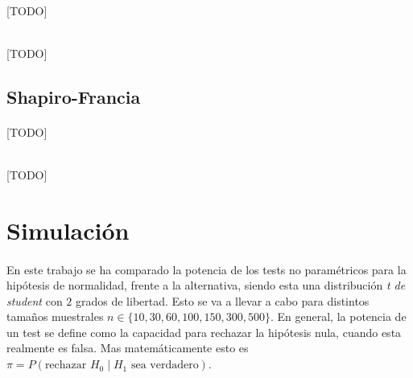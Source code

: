 \documentclass[a4paper, spanish]{article}
\begin{document}
      \paragraph{}
      [TODO]

      \begin{equation}
      \label{eq:test_andersondarling}
      \end{equation}

      \paragraph{}
      [TODO]

    \subsection{Shapiro-Francia}
    \label{sec:shapirofrancia}

      \paragraph{}
      [TODO]

      \begin{equation}
      \label{eq:test_shapirofrancia}
      \end{equation}

      \paragraph{}
      [TODO]

  \section{Simulación}
  \label{sec:simulation}

    \paragraph{}
    En este trabajo se ha comparado la potencia de los tests no paramétricos para la hipótesis de normalidad, frente a la alternativa, siendo esta una distribución \emph{t de student} con $2$ grados de libertad. Esto se va a llevar a cabo para distintos tamaños muestrales $n \in \{10, 30, 60, 100, 150, 300, 500\}$. En general, la potencia de un test se define como la capacidad para rechazar la hipótesis nula, cuando esta realmente es falsa. Mas matemáticamente esto es $\pi = P\left(\text{rechazar }H_{0} \mid H_{1} \text{ sea verdadero}\right)$.
\end{document}
